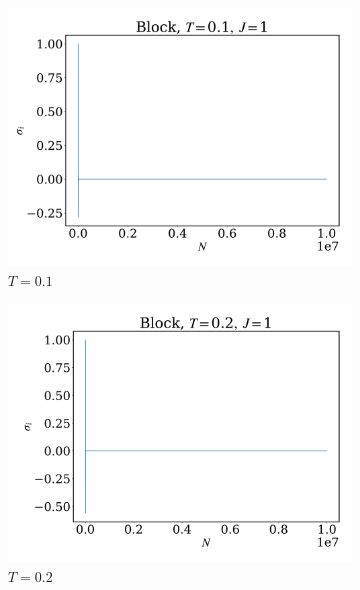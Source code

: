 \documentclass[12pt]{article}
\begin{document}
\begin{figure}
	\centering
	\begin{subfigure}[b]{0.49\textwidth}
		\centering
		\includegraphics[width=\textwidth]{fig1DJ1N1e7/sig_b_T0.1J1.pdf}
		\caption{$T=0.1$}
	\end{subfigure}
	\hfill
	\begin{subfigure}[b]{0.49\textwidth}
		\centering
		\includegraphics[width=\textwidth]{fig1DJ1N1e7/sig_b_T0.2J1.pdf}
		\caption{$T=0.2$}
	\end{subfigure}
	\hfill
	\begin{subfigure}[b]{0.49\textwidth}
		\centering

\end{subfigure}
\end{figure}
\end{document}
